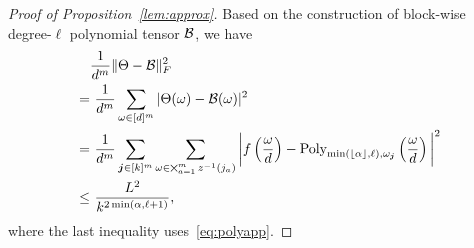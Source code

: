 \documentclass[12pt]{article}
\theoremstyle{definition}
\begin{document}
\begin{proof}[Proof of Proposition~\ref{lem:approx}]
Based on the construction of block-wise degree-$\ell$ polynomial tensor $\mathcal{B}$, we have 
\begin{align}
   & \frac{1}{d^m}\lVert\Theta-\mathcal{B}\rVert_F^2\\
=&\ \frac{1}{d^m} \sum_{\omega\in[d]^m}|\Theta(\omega)-\mathcal{B}(\omega)|^2\\
=&\ \frac{1}{d^m}\sum_{\bm{j}\in[k]^m}\sum_{\omega \in \bigtimes_{a=1}^m z^{-1}(j_a)}\bigg|f\left(\frac{\omega}{d}\right)-\text{Poly}_{\min(\lfloor \alpha \rfloor,\ell),\omega_{\bm{j}}}\left(\frac{\omega}{d}\right)\bigg|^2\\
    \leq
    &\ \frac{L^2}{k^{2\min(\alpha,\ell+1)}},
\end{align}
where the last inequality uses~\eqref{eq:polyapp}.
\end{proof}
\end{document}
